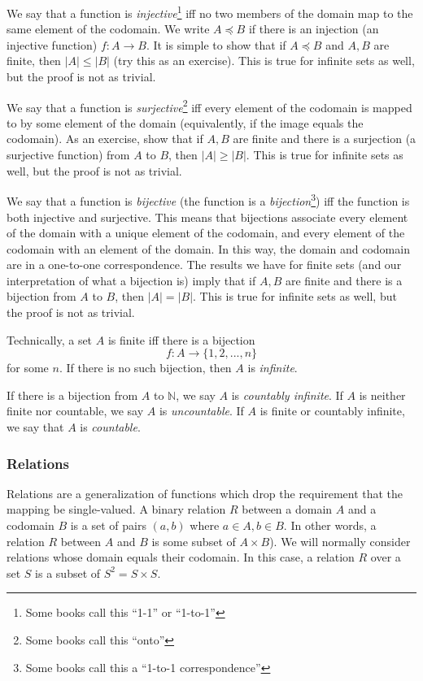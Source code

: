 \documentclass[12pt]{article}
\begin{document}
We say that a function is \emph{injective}\footnote{Some books call this ``1-1'' or ``1-to-1''} iff no two members of the domain map to the same element of the codomain. We write $A \preceq B$ if there is an injection (an injective function) $f: A \rightarrow B$. It is simple to show that if $A \preceq B$ and $A, B$ are finite, then $|A| \leq |B|$ (try this as an exercise). This is true for infinite sets as well, but the proof is not as trivial. 

We say that a function is \emph{surjective}\footnote{Some books call this ``onto''} iff every element of the codomain is mapped to by some element of the domain (equivalently, if the image equals the codomain). As an exercise, show that if $A, B$ are finite and there is a surjection (a surjective function) from $A$ to $B$, then $|A| \geq |B|$. This is true for infinite sets as well, but the proof is not as trivial. 

We say that a function is \emph{bijective} (the function is a \emph{bijection}\footnote{Some books call this a ``1-to-1 correspondence''}) iff the function is both injective and surjective. This means that bijections associate every element of the domain with a unique element of the codomain, and every element of the codomain with an element of the domain. In this way, the domain and codomain are in a one-to-one correspondence. The results we have for finite sets (and our interpretation of what a bijection is) imply that if $A, B$ are finite and there is a bijection from $A$ to $B$, then $|A| = |B|$. This is true for infinite sets as well, but the proof is not as trivial. 

Technically, a set $A$ is finite iff there is a bijection 
\[
  f: A \rightarrow \{1, 2,...,n\}
\]
for some $n$. If there is no such bijection, then $A$ is \emph{infinite}. 

If there is a bijection from $A$ to $\mathbb{N}$, we say $A$ is \emph{countably infinite}. If $A$ is neither finite nor countable, we say $A$ is \emph{uncountable}. If $A$ is finite or countably infinite, we say that $A$ is \emph{countable}. 

\subsubsection*{Relations}
Relations are a generalization of functions which drop the requirement that the mapping be single-valued. A binary relation $R$ between a domain $A$ and a codomain $B$ is a set of pairs $(a, b)$ where $a \in A, b \in B$. In other words, a relation $R$ between $A$ and $B$ is some subset of $A \times B$). We will normally consider relations whose domain equals their codomain. In this case, a relation $R$ over a set $S$ is a subset of $S^2 = S \times S$. 
\end{document}
